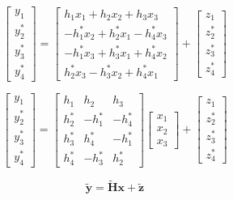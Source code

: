 \documentclass[fleqn]{article}
\begin{document}
\begin{enumerate}
\begin{enumerate}
			\begin{equation*}
				\begin{bmatrix}
					y_1 \\ y_2^* \\ y_3^* \\ y_4^*
				\end{bmatrix} = \begin{bmatrix}
					 h_1x_1   + h_2x_2   + h_3x_3 \\
					-h_1^*x_2 + h_2^*x_1 - h_4^*x_3 \\
					-h_1^*x_3 + h_3^*x_1 + h_4^*x_2 \\
					 h_2^*x_3 - h_3^*x_2 + h_4^*x_1
				\end{bmatrix} + \begin{bmatrix}
					z_1 \\ z_2^* \\ z_3^* \\ z_4^*
				\end{bmatrix}
			\end{equation*}
			
			\begin{equation*}
				\begin{bmatrix}
					y_1 \\ y_2^* \\ y_3^* \\ y_4^*
				\end{bmatrix} = \begin{bmatrix}
					h_1   &  h_2   &  h_3 \\
				    h_2^* & -h_1^* & -h_4^* \\
					h_3^* &  h_4^* & -h_1^* \\
					h_4^* & -h_3^* &  h_2^*
				\end{bmatrix} \begin{bmatrix}
					x_1 \\ x_2 \\ x_3
				\end{bmatrix} + \begin{bmatrix}
					z_1 \\ z_2^* \\ z_3^* \\ z_4^*
				\end{bmatrix}
			\end{equation*}
			
			\begin{equation*}
				\mathbf{\tilde{y}} = \mathbf{\tilde{H}x} + \mathbf{\tilde{z}}
			\end{equation*}
			

\end{enumerate}
\end{enumerate}
\end{document}
